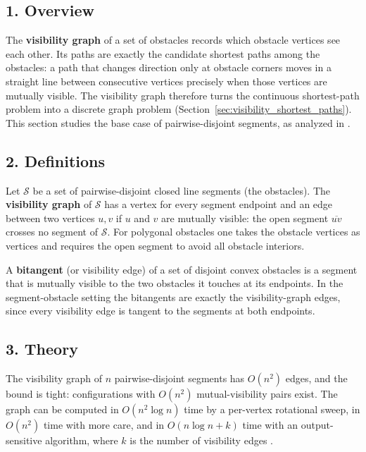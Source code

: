 \subsection{1. Overview}

The \textbf{visibility graph} of a set of obstacles
records which obstacle vertices see each other. Its paths are exactly the
candidate shortest paths among the obstacles: a path that changes direction
only at obstacle corners moves in a straight line between consecutive
vertices precisely when those vertices are mutually visible. The visibility
graph therefore turns the continuous shortest-path problem into a discrete
graph problem (Section~\ref{sec:visibility_shortest_paths}). This section
studies the base case of pairwise-disjoint segments, as analyzed in
\cite{berg2008}.

\subsection{2. Definitions}

\begin{definition}\label{def:vis_vg}
  Let $\mathcal{S}$ be a set of pairwise-disjoint closed line segments
  (the obstacles). The \textbf{visibility graph} of $\mathcal{S}$ has a
  vertex for every segment endpoint and an edge between two vertices $u, v$
  if $u$ and $v$ are mutually visible: the open segment $\overline{uv}$
  crosses no segment of $\mathcal{S}$. For polygonal obstacles one takes the
  obstacle vertices as vertices and requires the open segment to avoid all
  obstacle interiors.
\end{definition}

\begin{definition}[Bitangent]\label{def:vis_bitangent}
  A \textbf{bitangent} (or visibility edge) of a set of disjoint convex
  obstacles is a segment that is mutually visible to the two obstacles it
  touches at its endpoints. In the segment-obstacle setting the bitangents
  are exactly the visibility-graph edges, since every visibility edge is
  tangent to the segments at both endpoints.
\end{definition}

\subsection{3. Theory}

\begin{theorem}\label{thm:vis_complexity}
  The visibility graph of $n$ pairwise-disjoint segments has $O(n^2)$ edges,
  and the bound is tight: configurations with $O(n^2)$ mutual-visibility
  pairs exist. The graph can be computed in $O(n^2 \log n)$ time by a
  per-vertex rotational sweep, in $O(n^2)$ time with more care, and in
  $O(n \log n + k)$ time with an output-sensitive algorithm, where $k$ is
  the number of visibility edges \cite{ghoshmount1991,overmarswelzl1992}.
\end{theorem}

